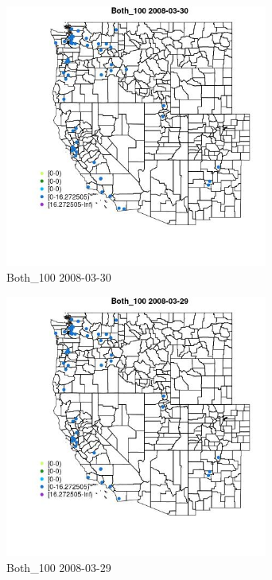 \begin{figure} 
\centering  
\includegraphics[width=0.77\textwidth]{Code_Outputs/Report_ML_input_PM25_Step4_part_e_de_duplicated_aves_MapObsBoth_1002008-03-30.jpg} 
\caption{\label{fig:Report_ML_input_PM25_Step4_part_e_de_duplicated_avesMapObsBoth_1002008-03-30}Both_100 2008-03-30} 
\end{figure} 
 

\begin{figure} 
\centering  
\includegraphics[width=0.77\textwidth]{Code_Outputs/Report_ML_input_PM25_Step4_part_e_de_duplicated_aves_MapObsBoth_1002008-03-29.jpg} 
\caption{\label{fig:Report_ML_input_PM25_Step4_part_e_de_duplicated_avesMapObsBoth_1002008-03-29}Both_100 2008-03-29} 
\end{figure} 
 

